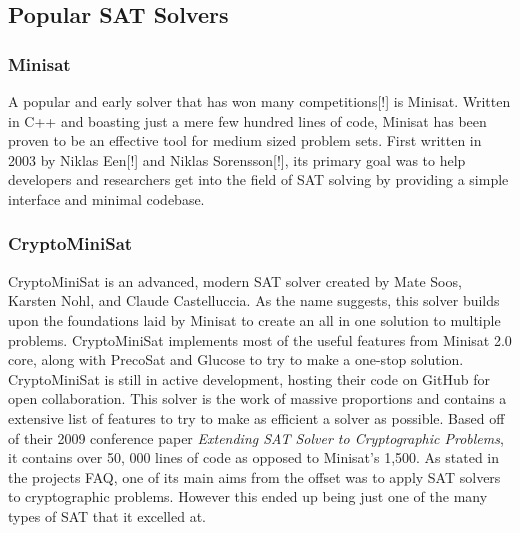 \documentclass{article}
\begin{document}
\subsection{Popular SAT Solvers}
\subsubsection{Minisat}
A popular and early solver that has won many competitions[!] is Minisat. Written in C++ and boasting
just a mere few hundred lines of code, Minisat has been proven to be an effective tool for medium
sized problem sets. First written in 2003 by Niklas Een[!] and Niklas Sorensson[!], its primary goal
was to help developers and researchers get into the field of SAT solving by providing a simple
interface and minimal codebase.


\subsubsection{CryptoMiniSat}
CryptoMiniSat is an advanced, modern SAT solver created by Mate Soos, Karsten Nohl, and Claude Castelluccia\cite{cryptominisat}.
As the name suggests, this solver builds upon the foundations laid by Minisat to create an all in one solution to multiple
problems. CryptoMiniSat implements most of the useful features from Minisat 2.0 core, along with PrecoSat and Glucose to try to
make a one-stop solution. CryptoMiniSat is still in active development, hosting their code on GitHub for open collaboration. This
solver is the work of massive proportions and contains a extensive list of features to try to make as efficient a solver as
possible. Based off of their 2009 conference paper \textit{Extending SAT Solver to Cryptographic Problems}, it contains over 50,
000 lines of code as opposed to Minisat's 1,500. As stated in the projects FAQ, one of its main aims from the offset was to apply
SAT solvers to cryptographic problems. However this ended up being just one of the many types of SAT that it excelled at.
\end{document}

